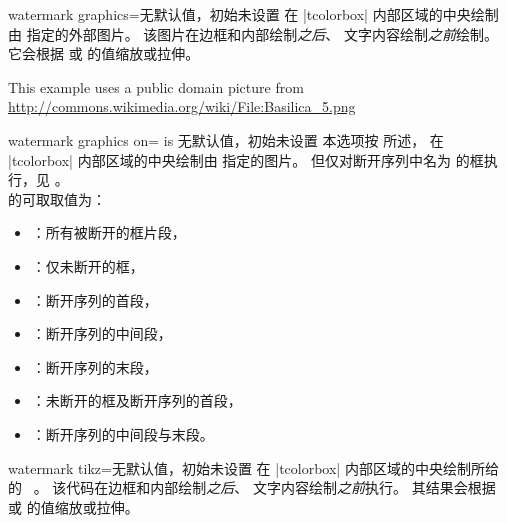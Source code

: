 \begin{docTcbKey}{watermark graphics}{=}{无默认值，初始未设置}
  在 |tcolorbox| 内部区域的中央绘制由  指定的外部图片。
  该图片在边框和内部绘制\emph{之后}、
  文字内容绘制\emph{之前}绘制。
  它会根据  或
   的值缩放或拉伸。
\begin{dispExample}

\begin{tcolorbox}[enhanced,title=My title,watermark graphics=Basilica_5.png,
  watermark opacity=0.15]
\lipsum[1-2]
\tcblower
This example uses a public domain picture from\\
\url{http://commons.wikimedia.org/wiki/File:Basilica_5.png}
\end{tcolorbox}
\end{dispExample}
\end{docTcbKey}


\begin{docTcbKey}{watermark graphics on}{= is }{无默认值，初始未设置}
  本选项按  所述，
  在 |tcolorbox| 内部区域的中央绘制由  指定的图片。
  但仅对断开序列中名为  的框执行，见 。\\
   的可取取值为：
  \begin{itemize}
  \item{}：所有被断开的框片段，
  \item{}：仅未断开的框，
  \item{}：断开序列的首段，
  \item{}：断开序列的中间段，
  \item{}：断开序列的末段，
  \item{}：未断开的框及断开序列的首段，
  \item{}：断开序列的中间段与末段。
  \end{itemize}
\end{docTcbKey}



\clearpage
\begin{docTcbKey}{watermark tikz}{=}{无默认值，初始未设置}
  在 |tcolorbox| 内部区域的中央绘制所给的 \tikzname\ 。
  该代码在边框和内部绘制\emph{之后}、
  文字内容绘制\emph{之前}执行。
  其结果会根据  或
   的值缩放或拉伸。
\begin{dispExample}

\begin{tcolorbox}[enhanced,title=My title,
  watermark tikz={\draw[line width=2mm] circle (1cm)
    node{\fontfamily{ptm}\fontseries{b}\fontsize{20mm}{20mm}\selectfont ?};}]
\lipsum[1]
\tcblower
\lipsum[2]
\end{tcolorbox}
\end{dispExample}
\end{docTcbKey}



